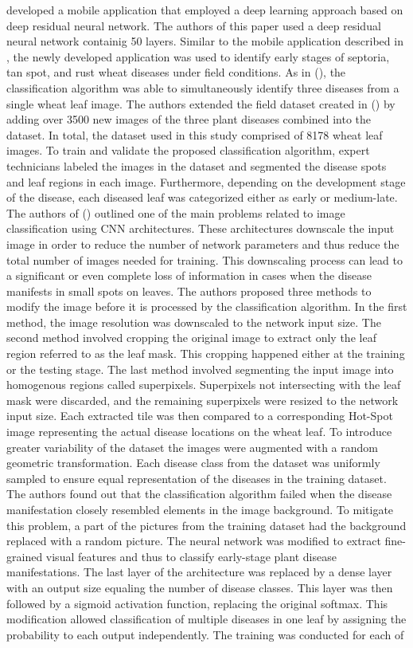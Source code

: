 \documentclass{BachelorBUI}
\begin{document}
\textcite{Picon:2019} developed a mobile application that employed a deep learning approach based on deep residual neural network. The authors of this paper used a deep residual neural network containig 50 layers. Similar to the mobile application described in \textcite{Johannes:2017}, the newly developed application was used to identify early stages of septoria, tan spot, and rust wheat diseases under field conditions. As in (\cite{Johannes:2017}), the classification algorithm was able to simultaneously identify three diseases from a single wheat leaf image. The authors extended the field dataset created in (\cite{Johannes:2017}) by adding over 3500 new images of the three plant diseases combined into the dataset. In total, the dataset used in this study comprised of 8178 wheat leaf images. To train and validate the proposed classification algorithm, expert technicians labeled the images in the dataset and segmented the disease spots and leaf regions in each image. Furthermore, depending on the development stage of the disease, each diseased leaf was categorized either as early or medium-late. The authors of (\cite{Picon:2019}) outlined one of the main problems related to image classification using CNN architectures. These architectures downscale the input image in order to reduce the number of network parameters and thus reduce the total number of images needed for training. This downscaling process can lead to a significant or even complete loss of information in cases when the disease manifests in small spots on leaves. The authors proposed three methods to modify the image before it is processed by the classification algorithm. In the first method, the image resolution was downscaled to the network input size. The second method involved cropping the original image to extract only the leaf region referred to as the leaf mask. This cropping happened either at the training or the testing stage. The last method involved segmenting the input image into homogenous regions called superpixels. Superpixels not intersecting with the leaf mask were discarded, and the remaining superpixels were resized to the network input size. Each extracted tile was then compared to a corresponding Hot-Spot image representing the actual disease locations on the wheat leaf. To introduce greater variability of the dataset the images were augmented with a random geometric transformation. Each disease class from the dataset was uniformly sampled to ensure equal representation of the diseases in the training dataset. The authors found out that the classification algorithm failed when the disease manifestation closely resembled elements in the image background. To mitigate this problem, a part of the pictures from the training dataset had the background replaced with a random picture. The neural network was modified to extract fine-grained visual features and thus to classify early-stage plant disease manifestations. The last layer of the architecture was replaced by a dense layer with an output size equaling the number of disease classes. This layer was then followed by a sigmoid activation function, replacing the original softmax. This modification allowed classification of multiple diseases in one leaf by assigning the probability to each output independently. The training was conducted for each of 
\end{document}
